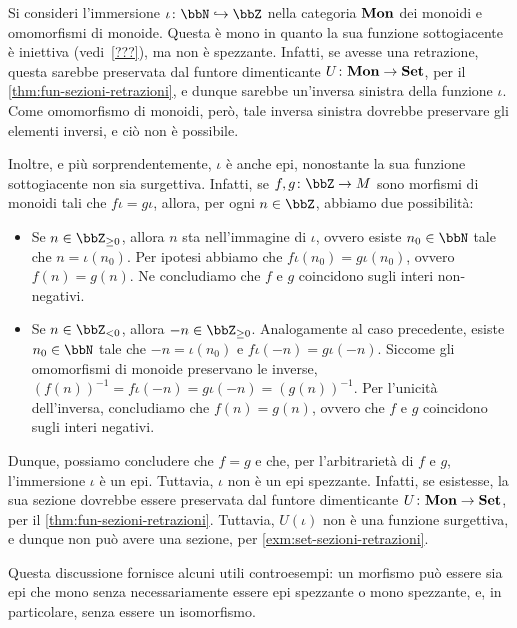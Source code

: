 \begin{example}
	Si consideri l'immersione \(\iota \colon \bbN \mono \bbZ\)
	nella categoria \(\mathbf{Mon}\) dei monoidi e omomorfismi di monoide.
	Questa è mono in quanto la sua funzione sottogiacente è iniettiva (vedi~\ref{???}),
	ma non è spezzante.
	Infatti, se avesse una retrazione,
	questa sarebbe preservata dal funtore dimenticante \(U \colon \mathbf{Mon} \to \mathbf{Set}\),
	per il \autoref{thm:fun-sezioni-retrazioni},
	e dunque sarebbe un'inversa sinistra della funzione \(\iota\).
	Come omomorfismo di monoidi, però, tale inversa sinistra dovrebbe preservare gli elementi inversi,
	e ciò non è possibile.

	Inoltre, e più sorprendentemente, \(\iota\) è anche epi,
	nonostante la sua funzione sottogiacente non sia surgettiva.
	Infatti, se \(f, g \colon \bbZ \to M\) sono morfismi di monoidi tali che \(f \iota = g \iota\),
	allora, per ogni \(n \in \bbZ\),
	abbiamo due possibilità:
	\begin{itemize}
		\item Se \(n \in \bbZ_{\geq 0}\), allora \(n\) sta nell'immagine di \(\iota\),
		 	ovvero esiste \(n_0 \in \bbN\) tale che \(n = \iota(n_0)\).
			Per ipotesi abbiamo che \(f \iota (n_0) = g \iota (n_0)\),
			ovvero \(f (n) = g (n)\).
			Ne concludiamo che \(f\) e \(g\) coincidono sugli interi non-negativi.
		\item Se \(n \in \bbZ_{< 0}\), allora \(-n \in \bbZ_{\geq 0}\).
			Analogamente al caso precedente, esiste \(n_0 \in \bbN\) tale che
			\(-n = \iota(n_0)\) e \(f \iota (-n) = g \iota (-n)\).
			Siccome gli omomorfismi di monoide preservano le inverse,
			\({(f (n))}^{-1} = f \iota {(-n)} = g \iota {(-n)} = {(g (n))}^{-1}\).
			Per l'unicità dell'inversa, concludiamo che \(f (n) = g (n)\),
			ovvero che \(f\) e \(g\) coincidono sugli interi negativi.
	\end{itemize}
	Dunque, possiamo concludere che \(f = g\)
	e che, per l'arbitrarietà di \(f\) e \(g\),
	l'immersione \(\iota\) è un epi. 
	Tuttavia, \(\iota\) non è un epi spezzante.
	Infatti, se esistesse, la sua sezione dovrebbe essere preservata dal funtore dimenticante \(U \colon \mathbf{Mon} \to \mathbf{Set}\),
	per il \autoref{thm:fun-sezioni-retrazioni}.
	Tuttavia, \(U(\iota)\) non è una funzione surgettiva,
	e dunque non può avere una sezione, per \autoref{exm:set-sezioni-retrazioni}.

	Questa discussione fornisce alcuni utili controesempi:
	un morfismo può essere sia epi che mono senza necessariamente essere epi spezzante o mono spezzante,
	e, in particolare, senza essere un isomorfismo.
\end{example}
